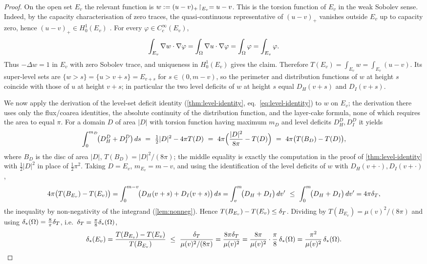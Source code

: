 \begin{proof}
On the open set $E_v$ the relevant function is
$w:=(u-v)_+\!\restriction_{E_v}=u-v$.  This is the torsion function of $E_v$ in the
weak Sobolev sense.  Indeed, by the capacity characterisation of zero traces,
the quasi-continuous representative of $(u-v)_+$ vanishes outside $E_v$ up to
capacity zero, hence $(u-v)_+\in H^1_0(E_v)$
\cite[\S4.7]{EvansGariepy2015}.  For every
$\varphi\in C_c^\infty(E_v)$,
\[
   \int_{E_v}\nabla w\cdot\nabla\varphi
   =\int_{\Omega}\nabla u\cdot\nabla\varphi
   =\int_{\Omega}\varphi
   =\int_{E_v}\varphi .
\]
Thus $-\Delta w=1$ in $E_v$ with zero Sobolev trace, and uniqueness in
$H^1_0(E_v)$ gives the claim.  Therefore
$T(E_v)=\int_{E_v}w=\int_{E_v}(u-v)$. Its super-level sets are
$\{w>s\}=\{u>v+s\}=E_{v+s}$ for $s\in(0,m-v)$, so the perimeter and
distribution functions of $w$ at height $s$ coincide with those of $u$ at
height $v+s$; in particular the two level deficits of $w$ at height $s$
equal $D_H(v+s)$ and $D_I(v+s)$.

We now apply the derivation of the level-set deficit identity
(\cref{thm:level-identity}, eq.~\eqref{eq:level-identity}) to $w$ on $E_v$;
the derivation there uses only the flux/coarea identities, the absolute
continuity of the distribution function, and the layer-cake formula, none of
which requires the area to equal $\pi$. For a domain $D$ of area $|D|$ with
torsion function having maximum $m_D$ and level deficits $D_H^D,D_I^D$ it
yields
\[
   \int_0^{m_D}\!\bigl(D_H^D+D_I^D\bigr)\,ds
   \ =\ \tfrac12|D|^2-4\pi T(D)
   \ =\ 4\pi\Bigl(\frac{|D|^2}{8\pi}-T(D)\Bigr)
   \ =\ 4\pi\bigl(T(B_D)-T(D)\bigr),
\]
where $B_D$ is the disc of area $|D|$, $T(B_D)=|D|^2/(8\pi)$; the middle
equality is exactly the computation in the proof of
\cref{thm:level-identity} with $\tfrac12|D|^2$ in place of
$\tfrac12\pi^2$. Taking $D=E_v$, $m_{E_v}=m-v$, and using the identification
of the level deficits of $w$ with $D_H(v+\cdot),D_I(v+\cdot)$,
\[
   4\pi\bigl(T(B_{E_v})-T(E_v)\bigr)
   =\int_0^{m-v}\!\bigl(D_H(v+s)+D_I(v+s)\bigr)\,ds
   =\int_v^m\!\bigl(D_H+D_I\bigr)\,dv'
   \ \le\ \int_0^m\!\bigl(D_H+D_I\bigr)\,dv'
   =4\pi\delta_T,
\]
the inequality by non-negativity of the integrand (\cref{lem:nonneg}).
Hence $T(B_{E_v})-T(E_v)\le\delta_T$. Dividing by
$T(B_{E_v})=\mu(v)^2/(8\pi)$ and using $\delta_{*}(\Omega)=\tfrac8\pi\delta_T$, i.e.\
$\delta_T=\tfrac\pi8\delta_{*}(\Omega)$,
\[
   \delta_{*}(E_v)=\frac{T(B_{E_v})-T(E_v)}{T(B_{E_v})}
   \ \le\ \frac{\delta_T}{\mu(v)^2/(8\pi)}
   =\frac{8\pi\delta_T}{\mu(v)^2}
   =\frac{8\pi}{\mu(v)^2}\cdot\frac\pi8\,\delta_{*}(\Omega)
   =\frac{\pi^2}{\mu(v)^2}\,\delta_{*}(\Omega).\qedhere
\]
\end{proof}

